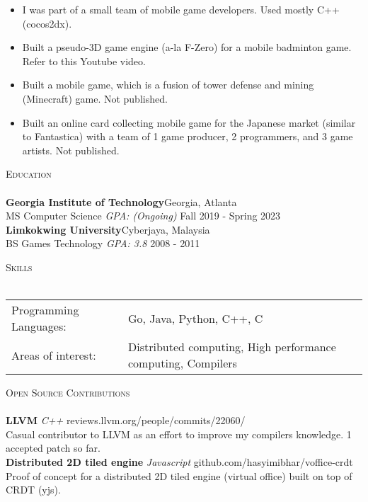 \documentclass[a4paper]{article}
\newcommand{\lineunder} {
    \vspace*{-8pt} \\
    \hspace*{-18pt} \hrulefill \\
}
\newcommand{\header} [1] {
    {\hspace*{-18pt}\vspace*{6pt} \textsc{#1}}
    \vspace*{-6pt} \lineunder
}
\begin{document}
\vspace{-1mm}
\begin{itemize} \itemsep 1pt
	\item I was part of a small team of mobile game developers. Used mostly C++ (cocos2dx).
	\item Built a pseudo-3D game engine (a-la F-Zero) for a mobile badminton game. Refer to this Youtube video.
	\item Built a mobile game, which is a fusion of tower defense and mining (Minecraft) game. Not published.
	\item Built an online card collecting mobile game for the Japanese market (similar to Fantastica) with a team of 1 game producer, 2 programmers, and 3 game artists. Not published.
\end{itemize}

\header{Education}
\textbf{Georgia Institute of Technology}\hfill Georgia, Atlanta\\
MS Computer Science \textit{GPA: (Ongoing)} \hfill Fall 2019 - Spring 2023\\
\vspace{2mm}
\textbf{Limkokwing University}\hfill Cyberjaya, Malaysia\\
BS Games Technology \textit{GPA: 3.8} \hfill 2008 - 2011\\
\vspace{2mm}

\header{Skills}
\begin{tabular}{ l l }
	Programming Languages: & Go, Java, Python, C++, C                                     \\
	Areas of interest:     & Distributed computing, High performance computing, Compilers \\
\end{tabular}
\vspace{2mm}

\header{Open Source Contributions}
{\textbf{LLVM}} {\sl C++} \hfill reviews.llvm.org/people/commits/22060/\\
Casual contributor to LLVM as an effort to improve my compilers knowledge. 1 accepted patch so far.\\
\vspace*{2mm}
{\textbf{Distributed 2D tiled engine}} {\sl Javascript} \hfill github.com/hasyimibhar/voffice-crdt\\
Proof of concept for a distributed 2D tiled engine (virtual office) built on top of CRDT (yjs).\\
\vspace*{2mm}



\ 
\end{document}
